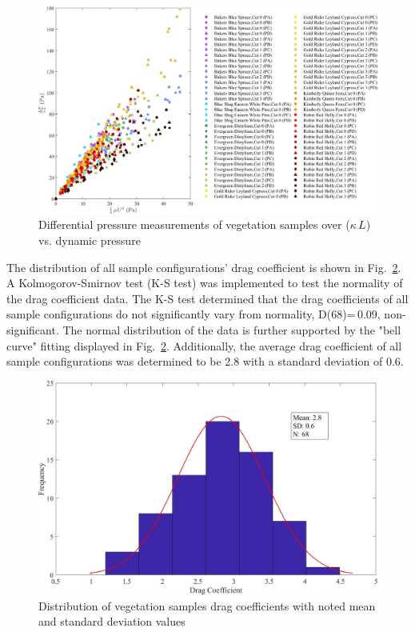 \documentclass[12pt]{article}
\begin{document}
\begin{figure}
	\centering
	\includegraphics[width=\textwidth,keepaspectratio]{Picture9.jpg}
	\caption{Differential pressure measurements of vegetation samples over ($\kappa \, L$) vs. dynamic pressure}
	\label{fig:DPoveraf(Overall)}
\end{figure}

The distribution of all sample configurations' drag coefficient is shown in Fig.~\ref{fig:Histogram}. A Kolmogorov-Smirnov test  (K-S test) was implemented to test the normality of the drag coefficient data. The K-S test determined that the drag coefficients of all sample configurations do not significantly vary from normality, D(68)=\,0.09, non-significant. The normal distribution of the data is further supported by the "bell curve" fitting displayed in  Fig.~\ref{fig:Histogram}. Additionally, the average drag coefficient of all sample configurations was determined to be 2.8 with a standard deviation of 0.6.

\begin{figure}[!h]
\includegraphics[width=\textwidth,keepaspectratio]{Picture11.jpg}
	\caption[Distribution of drag coefficients]{Distribution of vegetation samples drag coefficients with noted mean and standard deviation values}
	\label{fig:Histogram}
\end{figure}
\end{document}
